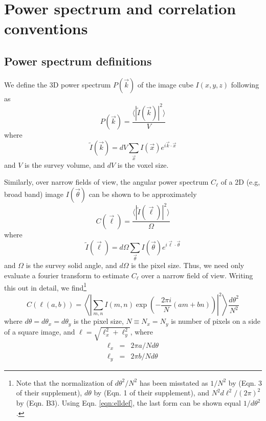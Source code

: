 \documentclass[preprint]{aastex}
\begin{document}
\section{Power spectrum and correlation conventions}
\label{sec:pspecconventions}

\subsection{Power spectrum definitions}

We define the 3D power spectrum $P(\vec{k})$ of the image cube $I(x,y,z)$ following \citet{ewallwice14} as 
\begin{equation}
	P(\vec{k}) = \frac{\langle|\tilde{I}(\vec{k})|^2\rangle}{V}
\end{equation}
where
\begin{equation}
	\tilde{I}(\vec{k})=dV\sum_{\vec{x}}I(\vec{x})e^{i\vec{k}\cdot\vec{x}}
\end{equation}
and $V$ is the survey volume, and $dV$ is the voxel size.

Similarly, over narrow fields of view, the angular power spectrum $C_\ell$ of a 2D (e.g, broad band) image $I(\vec{\theta})$ can be shown to be approximately
\begin{equation}
\label{eqn:Cldef0}
	C(\vec{\ell}) = \frac{\langle|\tilde{I}(\vec{\ell})|^2\rangle}{\Omega} 
\end{equation}
where
\begin{equation}
	\tilde{I}(\vec{\ell})=d\Omega\sum_{\vec{\theta}}I(\vec{\theta})e^{i\vec{\ell}\cdot\vec{\theta}}
\end{equation}
and $\Omega$ is the survey solid angle, and $d\Omega$ is the pixel size. Thus, we need only evaluate a fourier transform to estimate $C_\ell$ over a narrow field of view. Writing this out in detail, we find\footnote{Note that the normalization of $d\theta^2/N^2$ has been misstated as $1/N^2$ by \citet{zemcov14} (Eqn. 3 of their supplement), $d\theta$ by \citet{cooray12} (Eqn. 1 of their supplement), and $N^2d\ell^2/(2\pi)^2$ by \citet{thacker15} (Eqn. B3). Using Eqn. \ref{eqn:elldef}, the last form can be shown equal $1/d\theta^2$.} 
\begin{equation}
\label{eqn:Cldef}
	C(\ell(a,b))=\left\langle\left|\sum_{m,n}I(m,n)\exp\left(-\frac{2\pi i}{N}  (am+bn)\right)\right|^2\right\rangle\frac{d\theta^2}{N^2}
\end{equation}
where $d\theta=d\theta_x=d\theta_y$ is the pixel size, $N\equiv N_x=N_y$ is number of pixels on a side of a square image, and $\ell=\sqrt{\ell_x^2+\ell_y^2}$, where 
\begin{eqnarray}
\ell_x&=&2\pi a/N d\theta \label{eqn:elldef}\\
\ell_y&=&2\pi b/Nd\theta \label{eqn:elldef2}
\end{eqnarray}
\end{document}

